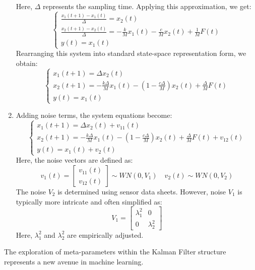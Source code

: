 \begin{example}
\begin{enumerate}
            Here, $\Delta$ represents the sampling time.
            Applying this approximation, we get: 
            \[\begin{cases}
                \frac{x_1(t+1)-x_1(t)}{\Delta}=x_2(t) \\
                \frac{x_2(t+1)-x_2(t)}{\Delta}=-\frac{k}{M}x_1(t)-\frac{c}{M}x_2(t)+\frac{1}{M}F(t) \\
                y(t)=x_1(t)
            \end{cases}\]
            Rearranging this system into standard state-space representation form, we obtain:
            \[\begin{cases}
                x_1(t+1)=\Delta x_2(t) \\
                x_2(t+1)=-\frac{k\Delta}{M}x_1(t)-\left(1-\frac{c\Delta}{M}\right)x_2(t)+\frac{\Delta}{M}F(t) \\
                y(t)=x_1(t)
            \end{cases}\]
        \item Adding noise terms, the system equations become:
            \[\begin{cases}
                x_1(t+1)=\Delta x_2(t)+v_{11}(t) \\
                x_2(t+1)=-\frac{k\Delta}{M}x_1(t)-\left(1-\frac{c\Delta}{M}\right)x_2(t)+\frac{\Delta}{M}F(t)+v_{12}(t) \\
                y(t)=x_1(t)+v_2(t)
            \end{cases}\]
            Here, the noise vectors are defined as:
            \[v_1(t)=\begin{bmatrix} v_{11}(t) \\ v_{12}(t) \end{bmatrix} \sim WN(0,V_1) \quad v_2(t)\sim WN(0,V_2)\]
            The noise $V_2$ is determined using sensor data sheets. 
            However, noise $V_1$ is typically more intricate and often simplified as:
            \[V_1=\begin{bmatrix}
                \lambda_1^2 & 0 \\
                0 & \lambda_2^2 
            \end{bmatrix}\]
            Here, $\lambda_1^2$ and $\lambda_2^2$ are empirically adjusted.
    \end{enumerate}
\end{example}
The exploration of meta-parameters within the Kalman Filter structure represents a new avenue in machine learning.